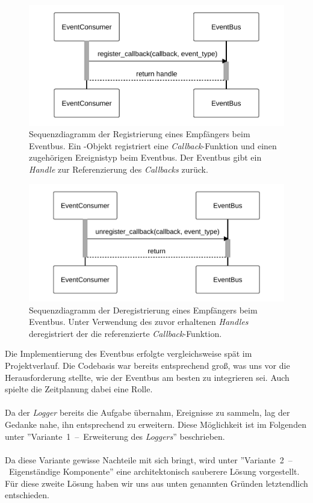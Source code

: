 \begin{figure}[!ht]
	\centering
	\includegraphics[width=0.70\linewidth]{images/diagrams/eventbus-register-seq.pdf}
	\caption{Sequenzdiagramm der Registrierung eines Empfängers beim Eventbus. Ein -Objekt registriert eine \emph{Callback}-Funktion und einen zugehörigen Ereignistyp beim Eventbus. Der Eventbus gibt ein \emph{Handle} zur Referenzierung des \emph{Callbacks} zurück.}
	\label{fig:eventbus-register-seq}
\end{figure}

\begin{figure}[!ht]
	\centering
	\includegraphics[width=0.70\linewidth]{images/diagrams/eventbus-unregister-seq.pdf}
	\caption{Sequenzdiagramm der Deregistrierung eines Empfängers beim Eventbus. Unter Verwendung des zuvor erhaltenen \emph{Handles} deregistriert der  die referenzierte \emph{Callback}-Funktion.}
	\label{fig:eventbus-unregister-seq}
\end{figure}

Die Implementierung des Eventbus erfolgte vergleichsweise spät im Projektverlauf. Die Codebasis war bereits entsprechend groß, was uns vor die Herausforderung stellte, wie der Eventbus am besten zu integrieren sei. Auch spielte die Zeitplanung dabei eine Rolle.\\
\\
Da der \emph{Logger} \cite{reisener_entwurf_2023} bereits die Aufgabe übernahm, Ereignisse zu sammeln, lag der Gedanke nahe, ihn entsprechend zu erweitern. Diese Möglichkeit ist im Folgenden unter ''Variante~1~--~Erweiterung des \emph{Loggers}'' beschrieben.\\
\\
Da diese Variante gewisse Nachteile mit sich bringt, wird unter ''Variante~2~--~Eigenständige Komponente'' eine architektonisch sauberere Lösung vorgestellt. Für diese zweite Lösung haben wir uns aus unten genannten Gründen letztendlich entschieden.

